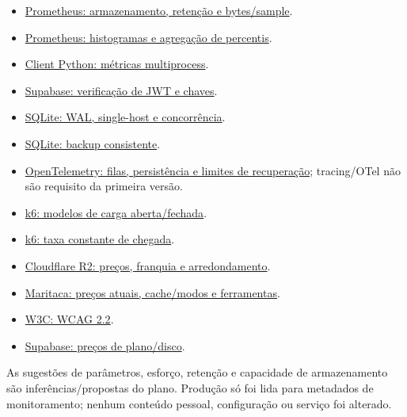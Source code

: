 \documentclass[10pt,a4paper]{article}
\providecommand{\tightlist}{\setlength{\itemsep}{1pt}\setlength{\parskip}{0pt}}
\begin{document}
\begin{itemize}
\tightlist
\item
  \href{https://prometheus.io/docs/prometheus/latest/storage/}{Prometheus:
  armazenamento, retenção e bytes/sample}.
\item
  \href{https://prometheus.io/docs/practices/histograms/}{Prometheus:
  histogramas e agregação de percentis}.
\item
  \href{https://prometheus.github.io/client_python/multiprocess/}{Client
  Python: métricas multiprocess}.
\item
  \href{https://supabase.com/docs/guides/auth/jwts}{Supabase:
  verificação de JWT e chaves}.
\item
  \href{https://www.sqlite.org/wal.html}{SQLite: WAL, single-host e
  concorrência}.
\item
  \href{https://www.sqlite.org/backup.html}{SQLite: backup consistente}.
\item
  \href{https://opentelemetry.io/docs/collector/resiliency/}{OpenTelemetry:
  filas, persistência e limites de recuperação}; tracing/OTel não são
  requisito da primeira versão.
\item
  \href{https://grafana.com/docs/k6/latest/using-k6/scenarios/concepts/open-vs-closed/}{k6:
  modelos de carga aberta/fechada}.
\item
  \href{https://grafana.com/docs/k6/latest/using-k6/scenarios/executors/constant-arrival-rate/}{k6:
  taxa constante de chegada}.
\item
  \href{https://developers.cloudflare.com/r2/pricing/}{Cloudflare R2:
  preços, franquia e arredondamento}.
\item
  \href{https://docs.maritaca.ai/pt/precos}{Maritaca: preços atuais,
  cache/modos e ferramentas}.
\item
  \href{https://www.w3.org/TR/WCAG22/}{W3C: WCAG 2.2}.
\item
  \href{https://supabase.com/pricing}{Supabase: preços de plano/disco}.
\end{itemize}

As sugestões de parâmetros, esforço, retenção e capacidade de
armazenamento são inferências/propostas do plano. Produção só foi lida
para metadados de monitoramento; nenhum conteúdo pessoal, configuração
ou serviço foi alterado.
\end{document}
